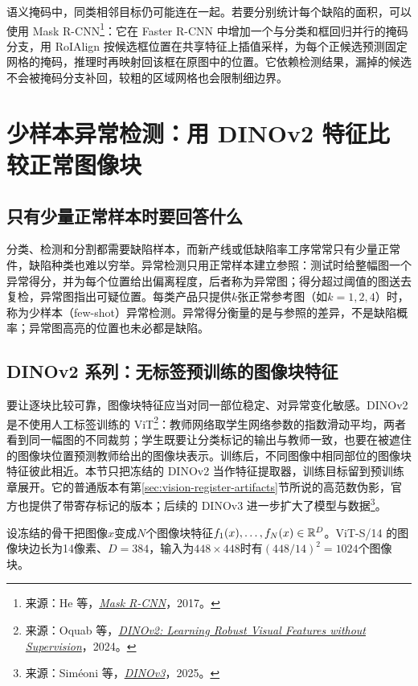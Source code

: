 语义掩码中，同类相邻目标仍可能连在一起。若要分别统计每个缺陷的面积，可以使用 Mask R-CNN\footnote{来源：He 等，\href{https://arxiv.org/abs/1703.06870}{\textit{Mask R-CNN}}，2017。}：它在 Faster R-CNN 中增加一个与分类和框回归并行的掩码分支，用 RoIAlign 按候选框位置在共享特征上插值采样，为每个正候选预测固定网格的掩码，推理时再映射回该框在原图中的位置。它依赖检测结果，漏掉的候选不会被掩码分支补回，较粗的区域网格也会限制细边界。

\section{少样本异常检测：用 DINOv2 特征比较正常图像块}
\label{sec:vision-fewshot-ad}
\subsection{只有少量正常样本时要回答什么}
分类、检测和分割都需要缺陷样本，而新产线或低缺陷率工序常常只有少量正常件，缺陷种类也难以穷举。异常检测只用正常样本建立参照：测试时给整幅图一个异常得分，并为每个位置给出偏离程度，后者称为异常图；得分超过阈值的图送去复检，异常图指出可疑位置。每类产品只提供$k$张正常参考图（如$k=1,2,4$）时，称为少样本（few-shot）异常检测。异常得分衡量的是与参照的差异，不是缺陷概率；异常图高亮的位置也未必都是缺陷。

\subsection{DINOv2 系列：无标签预训练的图像块特征}
要让逐块比较可靠，图像块特征应当对同一部位稳定、对异常变化敏感。DINOv2 是不使用人工标签训练的 ViT\footnote{来源：Oquab 等，\href{https://arxiv.org/abs/2304.07193}{\textit{DINOv2: Learning Robust Visual Features without Supervision}}，2024。}：教师网络取学生网络参数的指数滑动平均，两者看到同一幅图的不同裁剪；学生既要让分类标记的输出与教师一致，也要在被遮住的图像块位置预测教师给出的图像块表示。训练后，不同图像中相同部位的图像块特征彼此相近。本节只把冻结的 DINOv2 当作特征提取器，训练目标留到预训练章展开。它的普通版本有第\ref{sec:vision-register-artifacts}节所说的高范数伪影，官方也提供了带寄存标记的版本；后续的 DINOv3 进一步扩大了模型与数据\footnote{来源：Siméoni 等，\href{https://arxiv.org/abs/2508.10104}{\textit{DINOv3}}，2025。}。

设冻结的骨干把图像$x$变成$N$个图像块特征$f_1(x),\ldots,f_N(x)\in\mathbb{R}^D$。ViT-S/14 的图像块边长为14像素、$D=384$，输入为$448\times448$时有$(448/14)^2=1024$个图像块。

